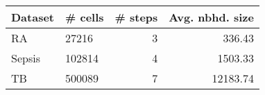 \begin{tabular}{llrr}
\toprule
Dataset & \# cells &  \# steps &  Avg. nbhd. size \\
\midrule
     RA &   27216 &        3 &           336.43 \\
 Sepsis &  102814 &        4 &          1503.33 \\
     TB &  500089 &        7 &         12183.74 \\
\bottomrule
\end{tabular}

